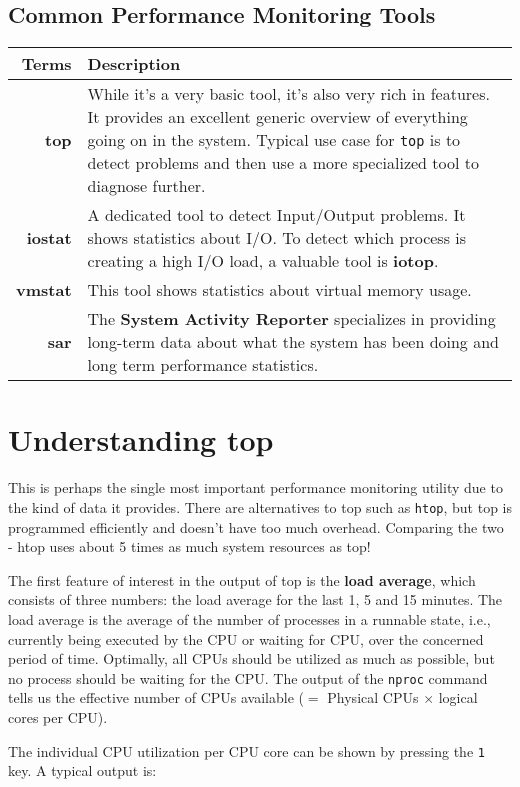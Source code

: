 \subsection{Common Performance Monitoring Tools}
\noindent
\begin{tabular}{rM{0.85}}
	\toprule
	\textbf{Terms} &\textbf{Description} \\
	\midrule
	\textbf{top} &While it's a very basic tool, it's also very rich in features. It provides an excellent generic overview of everything going on in the system. Typical use case for \verb|top| is to detect problems and then use a more specialized tool to diagnose further.\\
	\midrule
	\textbf{iostat}	&A dedicated tool to detect Input/Output problems. It shows statistics about I/O. To detect which process is creating a high I/O load, a valuable tool is \textbf{iotop}.  \\
	\midrule
	\textbf{vmstat}	&This tool shows statistics about virtual memory usage.\\
	\midrule
	\textbf{sar} &The \textbf{System Activity Reporter} specializes in providing long-term data about what the system has been doing and long term performance statistics. \\
	\bottomrule
\end{tabular}

	\section{Understanding top}
This is perhaps the single most important performance monitoring utility due to the kind of data it provides. There are alternatives to top such as \verb|htop|, but top is programmed efficiently and doesn't have too much overhead. Comparing the two - htop uses about 5 times as much system resources as top! 

The first feature of interest in the output of top is the \textbf{load average}, which consists of three numbers: the load average for the last 1, 5 and 15 minutes. The load average is the average of the number of processes in a runnable state, i.e., currently being executed by the CPU or waiting for CPU, over the concerned period of time. Optimally, all CPUs should be utilized as much as possible, but no process should be waiting for the CPU. The output of the \verb|nproc| command tells us the effective number of CPUs available ($=$ Physical CPUs $\times$ logical cores per CPU).

The individual CPU utilization per CPU core can be shown by pressing the \verb|1| key. A typical output is:

